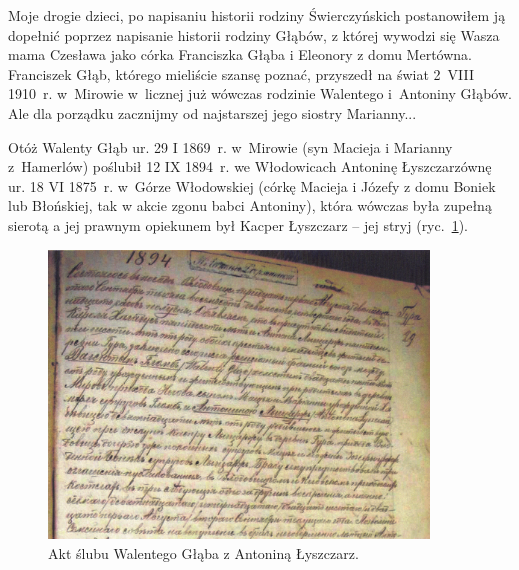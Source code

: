 Moje drogie dzieci, po napisaniu historii rodziny Świerczyńskich postanowiłem ją dopełnić poprzez napisanie historii rodziny Głąbów, z której wywodzi się Wasza mama Czesława jako córka Franciszka Głąba i Eleonory z domu Mertówna. Franciszek Głąb, którego mieliście szansę poznać, przyszedł na świat 2~VIII 1910~r. w~Mirowie w~licznej już wówczas rodzinie Walentego i~Antoniny Głąbów. Ale dla porządku zacznijmy od najstarszej jego siostry Marianny...

Otóż Walenty Głąb ur. 29 I 1869~r. w~Mirowie (syn Macieja i Marianny z~Hamerlów) poślubił 12 IX 1894~r. we Włodowicach Antoninę Łyszczarzównę ur. 18 VI 1875~r. w~Górze Włodowskiej (córkę Macieja i Józefy z domu Boniek lub Błońskiej, tak w akcie zgonu babci Antoniny), która wówczas była zupełną sierotą a jej prawnym opiekunem był Kacper Łyszczarz -- jej stryj (ryc.~\ref{rys:akt_slubu_walentego_glaba_i_antoniny_lyszczarz}).

\begin{figure}[!h]
\begin{center}
\includegraphics[width=0.9\textwidth]{zdjecia/akt_slubu_walentego_glaba_i_antoniny_lyszczarz.jpg}
\caption{Akt ślubu Walentego Głąba z Antoniną Łyszczarz.}
\label{rys:akt_slubu_walentego_glaba_i_antoniny_lyszczarz}
\end{center}
\end{figure}
